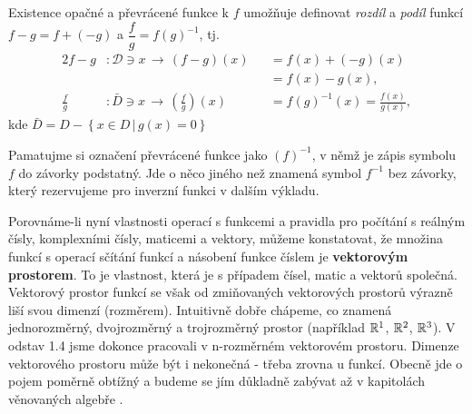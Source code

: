       Existence opačné a převrácené funkce k \(f\) umožňuje definovat \emph{rozdíl} a \emph{podíl} 
      funkcí \(f-g=f+(-g)\) a \(\dfrac{f}{g}=f(g)^{-1}\), tj.
      \begin{alignat*}{2}
        f-g         &: \mathcal{D}\ni x\,\rightarrow\, (f-g)(x)&&=f(x)+(-g)(x) \\
                    &                                          &&=f(x)-g(x),  \\
        \frac{f}{g} &: \bar{D}\ni x\,\rightarrow\, 
                                   \left(\frac{f}{g}\right)(x) &&= f(g)^{-1}(x) = \frac{f(x)}{g(x)}, 
      \end{alignat*}
      kde \(\bar{D}=D-\left\{x\in D\,\lvert\,g(x)=0 \right\}\) 
      
      \begin{mdframed}[style=mdnote]
        \begin{note}
          Pamatujme si označení převrácené funkce jako \((f)^{-1}\), v němž je zápis symbolu \(f\)
          do závorky podstatný. Jde o něco jiného než znamená symbol \(f^{-1}\) bez závorky, který
          rezervujeme pro inverzní funkci v dalším výkladu.
        \end{note}
      \end{mdframed}  

      \begin{mdframed}[style=mdnote]
        \begin{note}
          Porovnáme-li nyní vlastnosti operací s funkcemi a pravidla pro počítání s reálným čísly, 
          komplexními čísly, maticemi a vektory, můžeme konstatovat, že množina funkcí s operací 
          sčítání funkcí a násobení funkce číslem je \textbf{vektorovým prostorem}. To je vlastnost, 
          která je s případem čísel, matic a vektorů společná. Vektorový prostor funkcí se však od 
          zmiňovaných vektorových prostorů výrazně liší svou dimenzí (rozměrem). Intuitivně dobře 
          chápeme, co znamená jednorozměrný, dvojrozměrný a trojrozměrný prostor (například 
          \(\mathbb{R}^1\), \(\mathbb{R}^2\), \(\mathbb{R}^3\)). V odstav 1.4 jsme dokonce pracovali v 
          n-rozměrném vektorovém prostoru. Dimenze vektorového prostoru může být i nekonečná - třeba 
          zrovna u funkcí. Obecně jde o pojem poměrně obtížný a budeme se jím důkladně zabývat až v 
          kapitolách věnovaných algebře \cite[s.~58]{Musilova2009MA1}.
        \end{note}
      \end{mdframed}  
      
